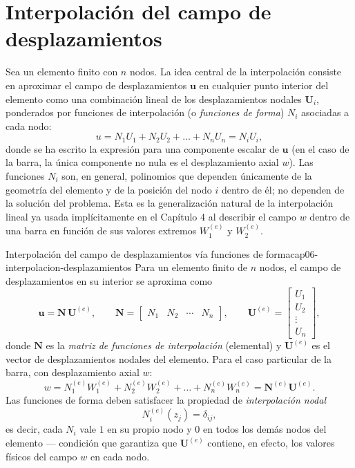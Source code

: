 \section{Interpolación del campo de desplazamientos}

Sea un elemento finito con $n$ nodos. La idea central de la interpolación consiste en aproximar el campo de desplazamientos $\bm u$ en cualquier punto interior del elemento como una combinación lineal de los desplazamientos nodales $\bm U_i$, ponderados por funciones de interpolación (o \emph{funciones de forma}) $N_i$ asociadas a cada nodo:
\[
u = N_1 U_1 + N_2 U_2 + \dots + N_n U_n = N_i U_i ,
\]
donde se ha escrito la expresión para una componente escalar de $\bm u$ (en el caso de la barra, la única componente no nula es el desplazamiento axial $w$). Las funciones $N_i$ son, en general, polinomios que dependen únicamente de la geometría del elemento y de la posición del nodo $i$ dentro de él; no dependen de la solución del problema. Esta es la generalización natural de la interpolación lineal ya usada implícitamente en el Capítulo 4 al describir el campo $w$ dentro de una barra en función de sus valores extremos $W_1^{(e)}$ y $W_2^{(e)}$.

\begin{ecnimportante}{Interpolación del campo de desplazamientos vía funciones de forma}{cap06-interpolacion-desplazamientos}
Para un elemento finito de $n$ nodos, el campo de desplazamientos en su interior se aproxima como
\[
\bm u = \bm N \, \bm U^{(e)}, \qquad
\bm N = \begin{bmatrix} N_1 & N_2 & \cdots & N_n \end{bmatrix},\qquad
\bm U^{(e)} = \begin{bmatrix} U_1 \\ U_2 \\ \vdots \\ U_n \end{bmatrix},
\]
donde $\bm N$ es la \emph{matriz de funciones de interpolación} (elemental) y $\bm U^{(e)}$ es el vector de desplazamientos nodales del elemento. Para el caso particular de la barra, con desplazamiento axial $w$:
\[
w = N_1^{(e)} W_1^{(e)} + N_2^{(e)} W_2^{(e)} + \dots + N_n^{(e)} W_n^{(e)} = \bm N^{(e)} \bm U^{(e)} .
\]
Las funciones de forma deben satisfacer la propiedad de \emph{interpolación nodal}
\[
N_i^{(e)}(z_j) = \delta_{ij},
\]
es decir, cada $N_i$ vale $1$ en su propio nodo y $0$ en todos los demás nodos del elemento --- condición que garantiza que $\bm U^{(e)}$ contiene, en efecto, los valores físicos del campo $w$ en cada nodo.
\end{ecnimportante}

